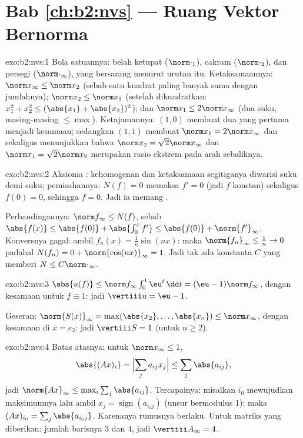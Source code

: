 \section*{Bab \ref{ch:b2:nvs} --- Ruang Vektor Bernorma}

\begin{solution}{exo:b2:nvs:1}
Bola satuannya: belah ketupat ($\norm\cdot_1$), cakram ($\norm\cdot_2$),
dan persegi ($\norm\cdot_\infty$), yang bersarang menurut urutan itu.
Ketaksamaannya: $\norm x_\infty \leq \norm x_2$ (sebab satu kuadrat
paling banyak sama dengan jumlahnya); $\norm x_2 \leq \norm x_1$ (setelah
dikuadratkan: $x_1^2 + x_2^2 \leq (\abs{x_1} + \abs{x_2})^2$); dan
$\norm x_1 \leq 2\norm x_\infty$ (dua suku, masing-masing $\leq \max$).
Ketajamannya: $(1, 0)$ membuat dua yang pertama menjadi kesamaan;
sedangkan $(1, 1)$ membuat $\norm x_1 = 2\norm x_\infty$ dan sekaligus
menunjukkan bahwa $\norm x_2 = \sqrt2 \norm x_\infty$ dan $\norm x_1 =
\sqrt2 \norm x_2$ merupakan rasio ekstrem pada arah sebaliknya.
\end{solution}

\begin{solution}{exo:b2:nvs:2}
Aksioma : kehomogenan dan ketaksamaan segitiganya diwarisi suku
demi suku; pemisahannya: $N(f) = 0$ memaksa $f' = 0$ (jadi $f$ konstan)
sekaligus $f(0) = 0$, sehingga $f = 0$. Jadi ia memang .

Perbandingannya: $\norm f_\infty \leq N(f)$, sebab $\abs{f(x)} \leq
\abs{f(0)} + \abs{\int_0^x f'} \leq \abs{f(0)} +
\norm{f'}_\infty$. Konversnya gagal: ambil $f_n(x) = \frac1n
\sin(nx)$: maka $\norm{f_n}_\infty \leq \frac1n \to 0$ padahal
$N(f_n) = 0 + \norm{\cos(nx)}_\infty = 1$. Jadi tak ada konstanta $C$
yang memberi $N \leq C\norm\cdot_\infty$.
\end{solution}

\begin{solution}{exo:b2:nvs:3}
$\abs{u(f)} \leq \norm f_\infty \int_0^1 \eu^t\,\dd t = (\eu -
1)\norm f_\infty$, dengan kesamaan untuk $f \equiv 1$: jadi $\vertiii u =
\eu - 1$.

Geseran: $\norm{S(x)}_\infty = \max(\abs{x_2}, \dots, \abs{x_n}) \leq
\norm x_\infty$, dengan kesamaan di $x = e_2$: jadi $\vertiii S = 1$
(untuk $n \geq 2$).
\end{solution}

\begin{solution}{exo:b2:nvs:4}
Batas atasnya: untuk $\norm x_\infty \leq 1$,
\[
\abs{(Ax)_i} = \Bigl|\sum_j a_{ij}x_j\Bigr| \leq \sum_j
\abs{a_{ij}},
\]
jadi $\norm{Ax}_\infty \leq \max_i \sum_j \abs{a_{ij}}$. Tercapainya:
misalkan $i_0$ mewujudkan maksimumnya lalu ambil $x_j =
\operatorname{sign}(a_{i_0 j})$ (unsur bermodulus $1$): maka $(Ax)_{i_0}
= \sum_j \abs{a_{i_0 j}}$. Karenanya rumusnya berlaku. Untuk matriks yang
diberikan: jumlah barisnya $3$ dan $4$, jadi $\vertiii A_\infty = 4$.
\end{solution}


